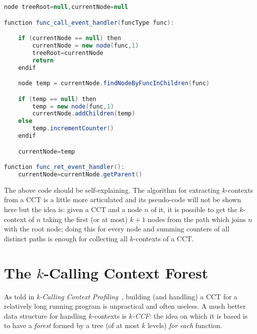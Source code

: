 \documentclass[a4paper,10pt]{report}
\begin{document}
\newpage

\begin{lstlisting}[language=java, label={cct_alg}, caption={An algorithm for building a CCT}, morekeywords={function,then,endif},frame=leftline,framesep=10pt]
node treeRoot=null,currentNode=null

function func_call_event_handler(funcType func):

	if (currentNode == null) then
		currentNode = new node(func,1)
		treeRoot=currentNode
		return
	endif

	node temp = currentNode.findNodeByFuncInChildren(func)

	if (temp == null) then
		temp = new node(func,1)
		currentNode.addChildren(temp)
	else
		temp.incrementCounter()
	endif

	currentNode=temp

function func_ret_event_handler():
	currentNode=currentNode.getParent()

\end{lstlisting}

The above code should be self-explaining.
The algorithm for extracting $k$-contexts from a CCT is a little more articulated
and its pseudo-code will not be shown here but the idea is: given a CCT and a node $n$ of it, it is possible to get the $k$-context of $n$ taking the first (or at most) $k+1$ nodes from the path which joins $n$ with the root node; doing this for every node and summing counters of all distinct paths is enough for collecting all $k$-contexts of a CCT.

\section{The $k$-Calling Context Forest}

As told in \emph{k-Calling Context Profiling}~\cite{kccf}, building (and handling) a CCT for a relatively long running program is unpractical and often useless.
A much better data structure for handling $k$-contexts is \emph{$k$-CCF}:
the idea on which it is based is to have a \emph{forest} formed by
a tree (of at most $k$ levels) \emph{for each} function.
\end{document}
